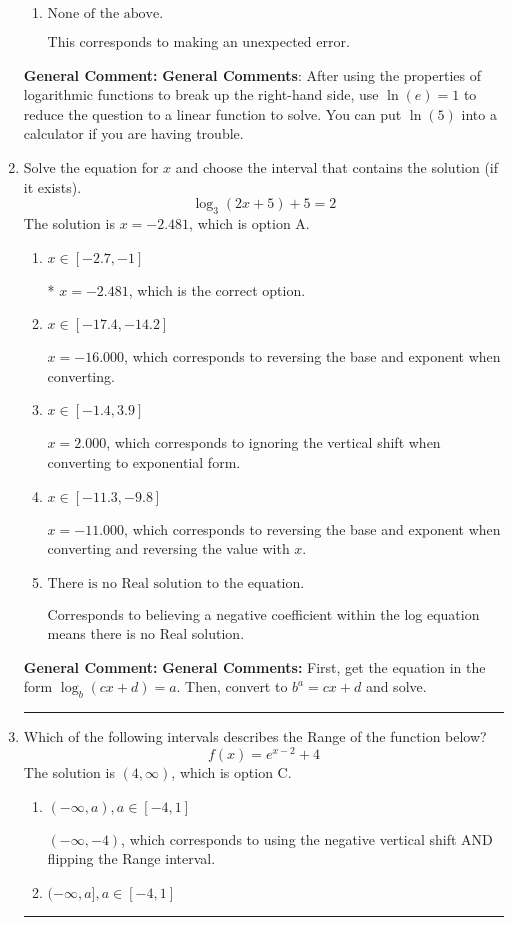 \documentclass{extbook}[14pt]
\newcommand{\litem}[1]{\item #1

\rule{\textwidth}{0.4pt}}
\begin{document}
\begin{enumerate}
{\begin{enumerate}[label=\Alph*.]
This corresponds to believing you cannot solve the equation.
\item \( \text{None of the above.} \)

This corresponds to making an unexpected error.
\end{enumerate}

\textbf{General Comment:} \textbf{General Comments}: After using the properties of logarithmic functions to break up the right-hand side, use $\ln(e) = 1$ to reduce the question to a linear function to solve. You can put $\ln(5)$ into a calculator if you are having trouble.
}
\litem{
Solve the equation for $x$ and choose the interval that contains the solution (if it exists).
\[ \log_{3}{(2x+5)}+5 = 2 \]The solution is \( x = -2.481 \), which is option A.\begin{enumerate}[label=\Alph*.]
\item \( x \in [-2.7, -1] \)

* $x = -2.481$, which is the correct option.
\item \( x \in [-17.4, -14.2] \)

$x = -16.000$, which corresponds to reversing the base and exponent when converting.
\item \( x \in [-1.4, 3.9] \)

$x = 2.000$, which corresponds to ignoring the vertical shift when converting to exponential form.
\item \( x \in [-11.3, -9.8] \)

$x = -11.000$, which corresponds to reversing the base and exponent when converting and reversing the value with $x$.
\item \( \text{There is no Real solution to the equation.} \)

Corresponds to believing a negative coefficient within the log equation means there is no Real solution.
\end{enumerate}

\textbf{General Comment:} \textbf{General Comments:} First, get the equation in the form $\log_b{(cx+d)} = a$. Then, convert to $b^a = cx+d$ and solve.
}
\litem{
Which of the following intervals describes the Range of the function below?
\[ f(x) = e^{x-2}+4 \]The solution is \( (4, \infty) \), which is option C.\begin{enumerate}[label=\Alph*.]
\item \( (-\infty, a), a \in [-4, 1] \)

$(-\infty, -4)$, which corresponds to using the negative vertical shift AND flipping the Range interval.
\item \( (-\infty, a], a \in [-4, 1] \)


\end{enumerate}}
\end{enumerate}
\end{document}

